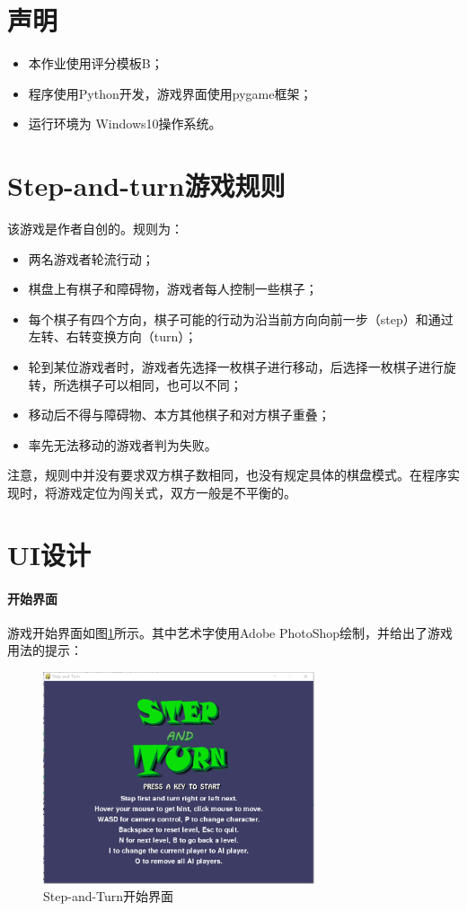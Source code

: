 \tableofcontents
\clearpage


\section{声明}
\begin{itemize}
\item 本作业使用评分模板B；
\item 程序使用{\ttfamily Python}开发，游戏界面使用{\ttfamily pygame}框架；
\item 运行环境为 {\ttfamily Windows10}操作系统。
\end{itemize}

\section{Step-and-turn游戏规则}
该游戏是作者自创的。规则为：
\begin{itemize}
	\item 两名游戏者轮流行动；
	\item 棋盘上有棋子和障碍物，游戏者每人控制一些棋子；
	\item 每个棋子有四个方向，棋子可能的行动为沿当前方向向前一步（step）和通过左转、右转变换方向（turn）；
	\item 轮到某位游戏者时，游戏者先选择一枚棋子进行移动，后选择一枚棋子进行旋转，所选棋子可以相同，也可以不同；
	\item 移动后不得与障碍物、本方其他棋子和对方棋子重叠；
	\item 率先无法移动的游戏者判为失败。
\end{itemize}

注意，规则中并没有要求双方棋子数相同，也没有规定具体的棋盘模式。在程序实现时，将游戏定位为闯关式，双方一般是不平衡的。

\section{UI设计}
\paragraph{开始界面}
游戏开始界面如图\ref{fig:startscreen}所示。其中艺术字使用{\ttfamily Adobe PhotoShop}绘制，并给出了游戏用法的提示：
\begin{figure}[htbp]
\centering
\includegraphics[width=8cm]{pic/startscreen.png}
\caption{Step-and-Turn开始界面}
\label{fig:startscreen}
\end{figure}

